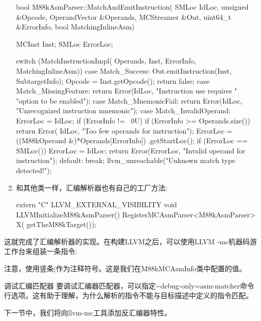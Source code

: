 \begin{enumerate}
\begin{cpp}
bool M88kAsmParser::MatchAndEmitInstruction(
        SMLoc IdLoc, unsigned &Opcode,
        OperandVector &Operands, MCStreamer &Out,
        uint64_t &ErrorInfo, bool MatchingInlineAsm) {
    MCInst Inst;
    SMLoc ErrorLoc;

    switch (MatchInstructionImpl(
            Operands, Inst, ErrorInfo, MatchingInlineAsm)) {
    case Match_Success:
        Out.emitInstruction(Inst, SubtargetInfo);
        Opcode = Inst.getOpcode();
        return false;
    case Match_MissingFeature:
        return Error(IdLoc, "Instruction use requires "
                     "option to be enabled");
    case Match_MnemonicFail:
        return Error(IdLoc,
                     "Unrecognized instruction mnemonic");
    case Match_InvalidOperand: {
        ErrorLoc = IdLoc;
        if (ErrorInfo != ~0U) {
            if (ErrorInfo >= Operands.size())
                return Error(
                    IdLoc, "Too few operands for instruction");
            ErrorLoc = ((M88kOperand &)*Operands[ErrorInfo])
                    .getStartLoc();
            if (ErrorLoc == SMLoc())
                ErrorLoc = IdLoc;
        }
        return Error(ErrorLoc,
                     "Invalid operand for instruction");
    }
    default:
        break;
    }
    llvm_unreachable("Unknown match type detected!");
}
\end{cpp}

\item
和其他类一样，汇编解析器也有自己的工厂方法:

\begin{cpp}
extern "C" LLVM_EXTERNAL_VISIBILITY void
LLVMInitializeM88kAsmParser() {
    RegisterMCAsmParser<M88kAsmParser> X(
        getTheM88kTarget());
}
\end{cpp}
\end{enumerate}

这就完成了汇编解析器的实现。在构建LLVM之后，可以使用LLVM -mc机器码游工作台来组装一条指令:


注意，使用竖条|作为注释符号。这是我们在M88kMCAsmInfo类中配置的值。

\begin{myTip}{调试汇编匹配器}
要调试汇编器匹配器，可以指定-{}-debug-only=asm-matcher命令行选项。这有助于理解，为什么解析的指令不能与目标描述中定义的指令匹配。
\end{myTip}

下一节中，我们将向llvm-mc工具添加反汇编器特性。































